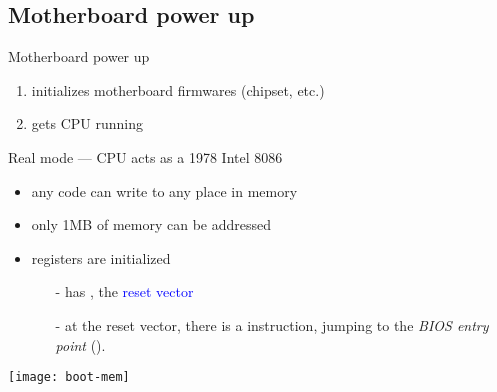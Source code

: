 \subsection{Motherboard power up}
\label{sec:motherboard-power-up}

\begin{frame}
  \begin{block}{Motherboard power up}
    \begin{enumerate}
    \item initializes motherboard firmwares (chipset, etc.)
    \item gets CPU running
    \end{enumerate}
  \end{block}
\end{frame}

\begin{frame}{Real mode}{ --- CPU acts as a 1978 Intel 8086}
  \begin{varwidth}{.52\textwidth}
    \begin{itemize}
    \item any code can write to any place in memory
    \item only 1MB of memory can be addressed
    \item registers are initialized
      \begin{itemize}
      \item[-]  has , the \textcolor{blue}{reset vector}
      \item[-] at the reset vector, there is a  instruction, jumping to the
        \emph{BIOS entry point} ().%
      \end{itemize}
    \end{itemize}
  \end{varwidth}\hfill
  \begin{varwidth}{.48\textwidth}
    \texttt{[image: boot-mem]}
  \end{varwidth}
\end{frame}

